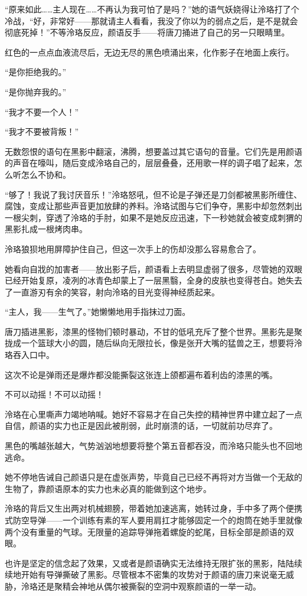 \documentclass[UTF8, scheme = chinese, openany]{ctexbook}
\begin{document}
“原来如此……主人现在……不再认为我可怕了是吗？”她的语气妖娆得让泠珞打了个冷战，“好，非常好——那就请主人看看，我没了你以为的弱点之后，是不是就会彻底死掉！”不等泠珞反应，颜语反手——将唐刀捅进了自己的另一只眼睛里。

红色的一点点血液流尽后，无边无尽的黑色喷涌出来，化作影子在地面上疾行。

“是你拒绝我的。”

“是你抛弃我的。”

“我才不要一个人！”

“我才不要被背叛！”

无数怨恨的语句在黑影中翻滚，沸腾，想要盖过其它语句的音量。它们先是用颜语的声音在嚎叫，随后变成泠珞自己的，层层叠叠，还用歌一样的调子唱了起来，怎么听怎么不协和。

“够了！我说了我讨厌音乐！”泠珞怒吼，但不论是子弹还是刀剑都被黑影所缠住、腐蚀，变成让那些声音更加放肆的养料。泠珞试图与它们争夺，黑影中却忽然刺出一根尖刺，穿透了泠珞的手肘，如果不是她反应迅速，下一秒她就会被变成刺猬的黑影扎成一根烤肉串。

泠珞狼狈地用屏障护住自己，但这一次手上的伤却没那么容易愈合了。

她看向自戕的加害者——放出影子后，颜语看上去明显虚弱了很多，尽管她的双眼已经开始复原，凌冽的冰青色却蒙上了一层黑翳，全身的皮肤也变得苍白。她失去了一直游刃有余的笑容，射向泠珞的目光变得神经质起来。

“主人，我——生气了。”她懒懒地用手指抹过刀面。

唐刀插进黑影，漆黑的怪物们顿时暴动，不甘的低吼充斥了整个世界。黑影先是聚拢成一个篮球大小的圆，随后纵向无限拉长，像是张开大嘴的猛兽之王，想要将泠珞吞入口中。

这次不论是弹雨还是爆炸都没能撕裂这张连上颌都遍布着利齿的漆黑的嘴。

不可以动摇！不可以动摇！

泠珞在心里嘶声力竭地呐喊。她好不容易才在自己失控的精神世界中建立起了一点自信，颜语的实力也正是因此被削弱，此时崩溃的话，一切就前功尽弃了。

黑色的嘴越张越大，气势汹汹地想要将整个第五音都吞没，而泠珞只能头也不回地逃命。

她不停地告诫自己颜语只是在虚张声势，毕竟自己已经不再将对方当做一个无敌的生物了，靠颜语原本的实力也未必真的能做到这个地步。

泠珞的背后又生出两对机械翅膀，带着她加速逃离，她转过身，手中多了两个便携式防空导弹——一个训练有素的军人要用肩扛才能够固定一个的炮筒在她手里就像两个没有重量的气球。无限量的追踪导弹拖着螺旋的蛇尾，目标全部是颜语的双眼。

也许是坚定的信念起了效果，又或者是颜语确实无法维持无限扩张的黑影，陆陆续续地开始有导弹撕破了黑影。尽管根本不密集的攻势对于颜语的唐刀来说毫无威胁，泠珞还是聚精会神地从偶尔被撕裂的空洞中观察颜语的一举一动。
\end{document}
